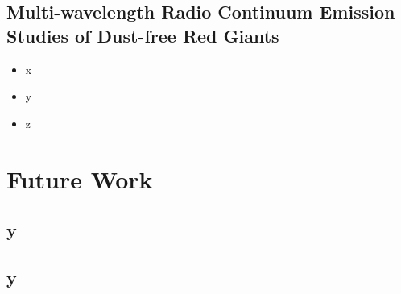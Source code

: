 \subsection{Multi-wavelength Radio Continuum Emission Studies of Dust-free Red Giants}\label{sec:8.1.2}

\begin{itemize}
  \item x
  \item y
  \item z
\end{itemize}


\section{Future Work}\label{sec:8.2}
\subsection{y}\label{sec:8.2.1}
\subsection{y}\label{sec:8.2.2}